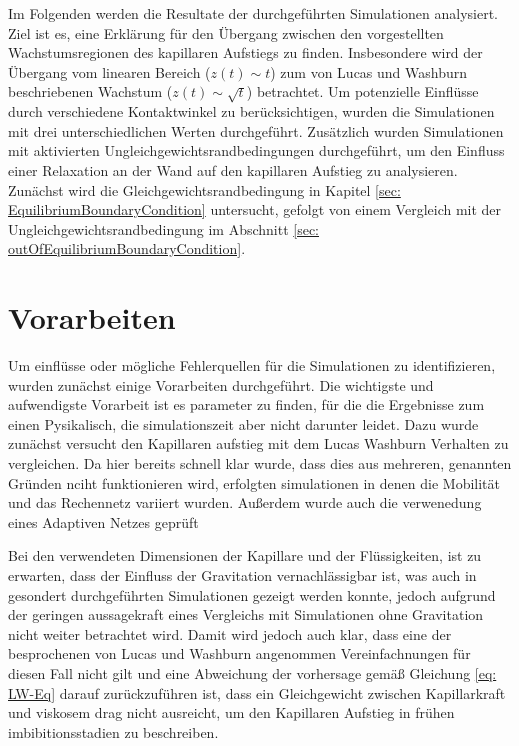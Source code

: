 Im Folgenden werden die Resultate der durchgeführten Simulationen analysiert. Ziel ist es, eine Erklärung für den Übergang zwischen den vorgestellten Wachstumsregionen des kapillaren Aufstiegs zu finden. Insbesondere wird der Übergang vom linearen Bereich ($z(t)\sim t$) zum von Lucas und Washburn beschriebenen Wachstum ($z(t)\sim \sqrt{t}$) betrachtet. Um potenzielle Einflüsse durch verschiedene Kontaktwinkel zu berücksichtigen, wurden die Simulationen mit drei unterschiedlichen Werten durchgeführt. Zusätzlich wurden Simulationen mit aktivierten Ungleichgewichtsrandbedingungen durchgeführt, um den Einfluss einer Relaxation an der Wand auf den kapillaren Aufstieg zu analysieren. Zunächst wird die Gleichgewichtsrandbedingung in Kapitel \ref{sec: EquilibriumBoundaryCondition} untersucht, gefolgt von einem Vergleich mit der Ungleichgewichtsrandbedingung im Abschnitt \ref{sec: outOfEquilibriumBoundaryCondition}.

\section{Vorarbeiten}
Um einflüsse oder mögliche Fehlerquellen für die Simulationen zu identifizieren, wurden zunächst einige Vorarbeiten durchgeführt.
Die wichtigste und aufwendigste Vorarbeit ist es parameter zu finden, für die die Ergebnisse zum einen Pysikalisch, die simulationszeit aber nicht darunter leidet. Dazu wurde zunächst versucht den Kapillaren aufstieg mit dem Lucas Washburn Verhalten zu vergleichen. Da hier bereits schnell klar wurde, dass dies aus mehreren, genannten Gründen nciht funktionieren wird, erfolgten simulationen in denen die Mobilität und das Rechennetz variiert wurden. Außerdem wurde auch die verwenedung eines Adaptiven Netzes geprüft


Bei den verwendeten Dimensionen der Kapillare und der Flüssigkeiten, ist zu erwarten, dass der Einfluss der Gravitation vernachlässigbar ist, was auch in gesondert durchgeführten Simulationen gezeigt werden konnte, jedoch aufgrund der geringen aussagekraft eines Vergleichs mit Simulationen ohne Gravitation nicht weiter betrachtet wird. Damit wird jedoch auch klar, dass eine der besprochenen von Lucas und Washburn angenommen Vereinfachnungen für diesen Fall nicht gilt und eine Abweichung der vorhersage gemäß Gleichung \ref{eq: LW-Eq} darauf zurückzuführen ist, dass ein Gleichgewicht zwischen Kapillarkraft und viskosem drag nicht ausreicht, um den Kapillaren Aufstieg in frühen imbibitionsstadien zu beschreiben.

